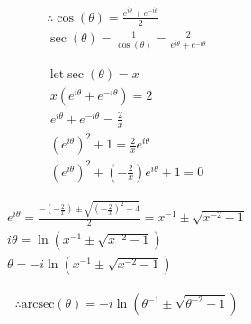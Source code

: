 \documentclass{../../style}
\begin{document}
\eulerformula

\begin{gather*}
	\therefore \cos(\theta) = \frac{e^{i\theta} + e^{-i\theta}}{2} \\
	\sec(\theta) = \frac{1}{\cos(\theta)} = \frac{2}{e^{i\theta} + e^{-i\theta}}
\end{gather*}

\begin{gather*}
	\text{let} \sec(\theta) = x \\
	x(e^{i\theta} + e^{-i\theta}) = 2 \\
	e^{i\theta} + e^{-i\theta} = \frac{2}{x} \\
	(e^{i\theta})^2 + 1 = \frac{2}{x}e^{i\theta} \\
	(e^{i\theta})^2 + (-\frac{2}{x})e^{i\theta} + 1 = 0
\end{gather*}

\begin{gather*}
	e^{i\theta} = \frac{-(-\frac{2}{x}) \pm \sqrt{(-\frac{2}{x})^2 - 4}}{2} = x^{-1} \pm \sqrt{x^{-2} - 1} \\
	i\theta = \ln(x^{-1} \pm \sqrt{x^{-2} - 1}) \\
	\theta = -i\ln(x^{-1} \pm \sqrt{x^{-2} - 1})
\end{gather*}

\begin{gather*}
	\therefore \text{arcsec}(\theta) = -i\ln(\theta^{-1} \pm \sqrt{\theta^{-2} - 1})
\end{gather*}
\end{document}
